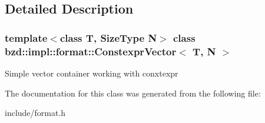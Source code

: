 \subsection{Detailed Description}
\subsubsection*{template$<$class T, Size\+Type N$>$\newline
class bzd\+::impl\+::format\+::\+Constexpr\+Vector$<$ T, N $>$}

Simple vector container working with conxtexpr 

The documentation for this class was generated from the following file\+:\begin{DoxyCompactItemize}
\item 
include/format.\+h\end{DoxyCompactItemize}
